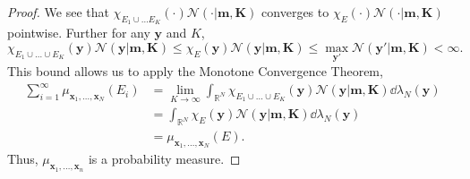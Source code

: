 \begin{proof}
    We see that $\chi_{E_1 \cup \dots E_K}(\cdot)\mathcal{N}(\cdot | \mathbf{m}, \mathbf{K})$ converges to $\chi_E(\cdot) \mathcal{N}(\cdot | \mathbf{m}, \mathbf{K})$ pointwise.
    Further for any $\mathbf{y}$ and $K$,
    \begin{equation*}
        \chi_{E_1 \cup \dots \cup E_K}(\mathbf{y}) \mathcal{N}(\mathbf{y} | \mathbf{m}, \mathbf{K})
        \leq
        \chi_E(\mathbf{y}) \mathcal{N}(\mathbf{y} | \mathbf{m}, \mathbf{K})
        \leq \max_{\mathbf{y}'}\mathcal{N}(\mathbf{y'} | \mathbf{m}, \mathbf{K})
        < \infty.
    \end{equation*}
    This bound allows us to apply the Monotone Convergence Theorem,
    \begin{align*}
        \sum_{i = 1}^{\infty} \mu_{\mathbf{x}_1, \dots, \mathbf{x}_N}(E_i)
        & = \lim_{K \to \infty}\int_{\mathbb{R}^{N}} \chi_{E_1 \cup \dots \cup E_K}(\mathbf{y})\mathcal{N}(\mathbf{y} | \mathbf{m}, \mathbf{K}) \dd \lambda_N(\mathbf{y}) \\
        & = \int_{\mathbb{R}^{N}} \chi_{E}(\mathbf{y})\mathcal{N}(\mathbf{y} | \mathbf{m}, \mathbf{K}) \dd \lambda_N(\mathbf{y}) \\
        & = \mu_{\mathbf{x}_1, \dots, \mathbf{x}_N}(E).
    \end{align*}
    Thus, $\mu_{\mathbf{x}_1, \dots, \mathbf{x}_n}$ is a probability measure.


\end{proof}
